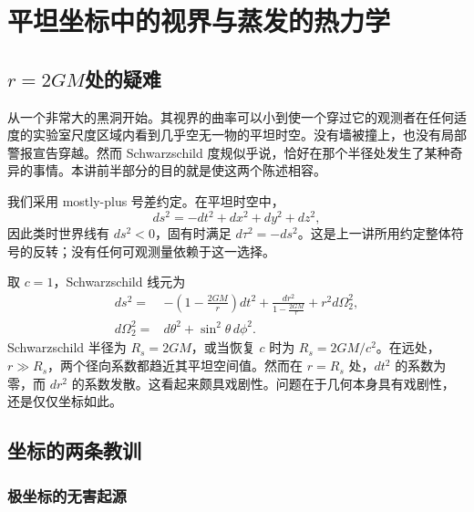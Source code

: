 \chapter{平坦坐标中的视界与蒸发的热力学}


\section{\texorpdfstring{\(r=2GM\)}{r=2GM}处的疑难}

从一个非常大的黑洞开始。其视界的曲率可以小到使一个穿过它的观测者在任何适度的实验室尺度区域内看到几乎空无一物的平坦时空。没有墙被撞上，也没有局部警报宣告穿越。然而 Schwarzschild 度规似乎说，恰好在那个半径处发生了某种奇异的事情。本讲前半部分的目的就是使这两个陈述相容。

我们采用 mostly-plus 号差约定。在平坦时空中，
\begin{equation}
ds^2=-dt^2+dx^2+dy^2+dz^2,
\end{equation}
因此类时世界线有 \(ds^2<0\)，固有时满足 \(d\tau^2=-ds^2\)。这是上一讲所用约定整体符号的反转；没有任何可观测量依赖于这一选择。

取 \(c=1\)，Schwarzschild 线元为
\begin{equation}
\begin{aligned}
ds^2={}&-\left(1-\frac{2GM}{r}\right)dt^2
+\frac{dr^2}{1-\frac{2GM}{r}}
+r^2d\Omega_2^2,\\
d\Omega_2^2={}&d\theta^2+\sin^2\theta\,d\phi^2 .
\end{aligned}
\label{eq:l03-schwarzschild}
\end{equation}
Schwarzschild 半径为 \(R_s=2GM\)，或当恢复 \(c\) 时为 \(R_s=2GM/c^2\)。在远处，\(r\gg R_s\)，两个径向系数都趋近其平坦空间值。然而在 \(r=R_s\) 处，\(dt^2\) 的系数为零，而 \(dr^2\) 的系数发散。这看起来颇具戏剧性。问题在于几何本身具有戏剧性，还是仅仅坐标如此。

\section{坐标的两条教训}

\subsection{极坐标的无害起源}

